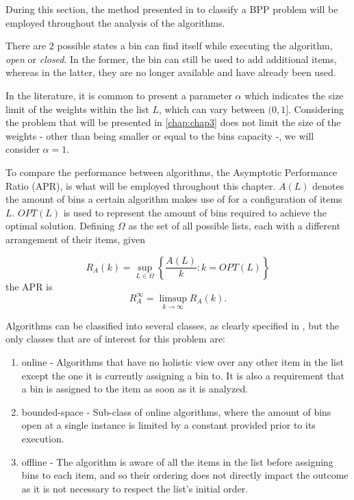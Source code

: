 During this section, the method presented in \cite{coffman2013bin} to classify a BPP problem will be employed throughout the analysis of the algorithms.

There are 2 possible states a bin can find itself while executing the algorithm, \textit{open} or \textit{closed}. In the former, the bin can still be used to add additional items, whereas in the latter, they are no longer available and have already been used.

In the literature, it is common to present a parameter $\alpha$ which indicates the size limit of the weights within the list $L$, which can vary between \( (0, 1] \). Considering the problem that will be presented in \ref{chap:chap3} does not limit the size of the weights - other than being smaller or equal to the bins capacity -, we will consider $\alpha = 1$. 

To compare the performance between algorithms, the Asymptotic Performance Ratio (APR), is what will be employed throughout this chapter. $A(L)$ denotes the amount of bins a certain algorithm makes use of for a configuration of items $L$. $OPT(L)$ is used to represent the amount of bins required to achieve the optimal solution. Defining $\Omega$ as the set of all possible lists, each with a different arrangement of their items, given 

\begin{equation}
    R_A (k) = \sup_{L \in \Omega} \left \{ \frac{A(L)}{k} : k = OPT(L) \right \}
\end{equation}
the APR is
\begin{equation}
    R_A^\infty = \limsup_{k \to \infty} R_A(k).
\end{equation}

Algorithms can be classified into several classes, as clearly specified in \cite{coffman2013bin}, but the only classes that are of interest for this problem are:
\begin{enumerate}
    \item online - Algorithms that have no holistic view over any other item in the list except the one it is currently assigning a bin to. It is also a requirement that a bin is assigned to the item as soon as it is analyzed.
    \item bounded-space - Sub-class of online algorithms, where the amount of bins open at a single instance is limited by a constant provided prior to its execution.
    \item offline - The algorithm is aware of all the items in the list before assigning bins to each item, and so their ordering does not directly impact the outcome as it is not necessary to respect the list's initial order.
\end{enumerate}

